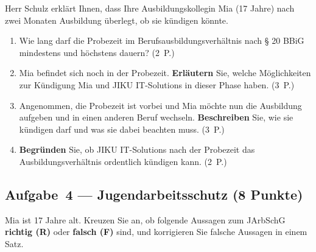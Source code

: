\documentclass[11pt, a4paper]{article}
\begin{document}
Herr Schulz erklärt Ihnen, dass Ihre Ausbildungskollegin Mia (17 Jahre) nach zwei Monaten Ausbildung überlegt, ob sie kündigen könnte.

\begin{enumerate}[label=(\alph*)]
  \item Wie lang darf die Probezeit im Berufsausbildungsverhältnis nach § 20 BBiG mindestens und höchstens dauern? \hfill (2~P.)

  \vspace{2cm}

  \item Mia befindet sich noch in der Probezeit. \textbf{Erläutern} Sie, welche Möglichkeiten zur Kündigung Mia und JIKU IT-Solutions in dieser Phase haben. \hfill (3~P.)

  \vspace{3cm}

  \item Angenommen, die Probezeit ist vorbei und Mia möchte nun die Ausbildung aufgeben und in einen anderen Beruf wechseln. \textbf{Beschreiben} Sie, wie sie kündigen darf und was sie dabei beachten muss. \hfill (3~P.)

  \vspace{3cm}

  \item \textbf{Begründen} Sie, ob JIKU IT-Solutions nach der Probezeit das Ausbildungsverhältnis ordentlich kündigen kann. \hfill (2~P.)

  \vspace{2.5cm}
\end{enumerate}

\subsection*{Aufgabe~4 --- Jugendarbeitsschutz (8 Punkte)}

Mia ist 17 Jahre alt. Kreuzen Sie an, ob folgende Aussagen zum JArbSchG \textbf{richtig (R)} oder \textbf{falsch (F)} sind, und korrigieren Sie falsche Aussagen in einem Satz.
\end{document}
